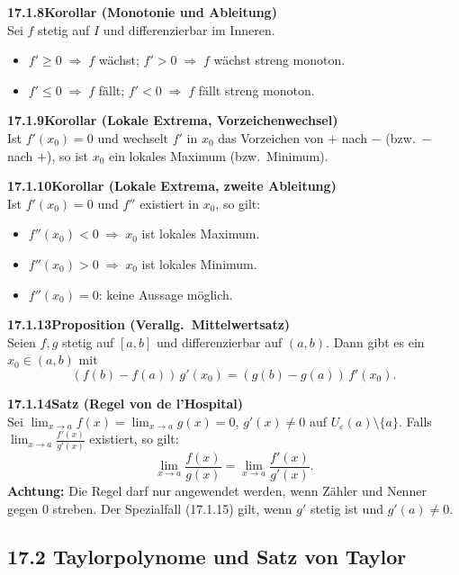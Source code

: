 \documentclass[a4paper,12pt]{article}
\newcommand{\gentry}[3]{%
  \noindent\textbf{#1\quad #2}\nopagebreak\\[0.2em]
  #3\par\smallskip
}
\begin{document}
\gentry{17.1.8}{Korollar (Monotonie und Ableitung)}{%
  Sei $f$ stetig auf $I$ und differenzierbar im Inneren.
  \begin{itemize}[topsep=2pt,itemsep=1pt]
    \item $f' \ge 0 \;\Rightarrow\; f$ wächst; \quad $f' > 0 \;\Rightarrow\; f$ wächst streng monoton.
    \item $f' \le 0 \;\Rightarrow\; f$ fällt; \quad $f' < 0 \;\Rightarrow\; f$ fällt streng monoton.
  \end{itemize}
}

\gentry{17.1.9}{Korollar (Lokale Extrema, Vorzeichenwechsel)}{%
  Ist $f'(x_0) = 0$ und wechselt $f'$ in $x_0$ das Vorzeichen von $+$ nach $-$
  (bzw.\ $-$ nach $+$), so ist $x_0$ ein lokales Maximum (bzw.\ Minimum).
}

\gentry{17.1.10}{Korollar (Lokale Extrema, zweite Ableitung)}{%
  Ist $f'(x_0) = 0$ und $f''$ existiert in $x_0$, so gilt:
  \begin{itemize}[topsep=2pt,itemsep=1pt]
    \item $f''(x_0) < 0 \;\Rightarrow\; x_0$ ist lokales Maximum.
    \item $f''(x_0) > 0 \;\Rightarrow\; x_0$ ist lokales Minimum.
    \item $f''(x_0) = 0$: keine Aussage möglich.
  \end{itemize}
}

\gentry{17.1.13}{Proposition (Verallg.\ Mittelwertsatz)}{%
  Seien $f,g$ stetig auf $[a,b]$ und differenzierbar auf $(a,b)$. Dann gibt es
  ein $x_0 \in (a,b)$ mit
  \[
    (f(b)-f(a))\,g'(x_0) = (g(b)-g(a))\,f'(x_0).
  \]
}

\gentry{17.1.14}{Satz (Regel von de l'Hospital)}{%
  Sei $\lim_{x\to a}f(x) = \lim_{x\to a}g(x) = 0$, $g'(x)\ne 0$ auf $U_\varepsilon(a)\setminus\{a\}$.
  Falls $\lim_{x\to a}\frac{f'(x)}{g'(x)}$ existiert, so gilt:
  \[
    \lim_{x\to a}\frac{f(x)}{g(x)} = \lim_{x\to a}\frac{f'(x)}{g'(x)}.
  \]
  \textbf{Achtung:} Die Regel darf nur angewendet werden, wenn Zähler und
  Nenner gegen $0$ streben. Der Spezialfall (17.1.15) gilt, wenn $g'$ stetig
  ist und $g'(a)\ne 0$.
}

\subsection*{17.2 \quad Taylorpolynome und Satz von Taylor}
\end{document}
